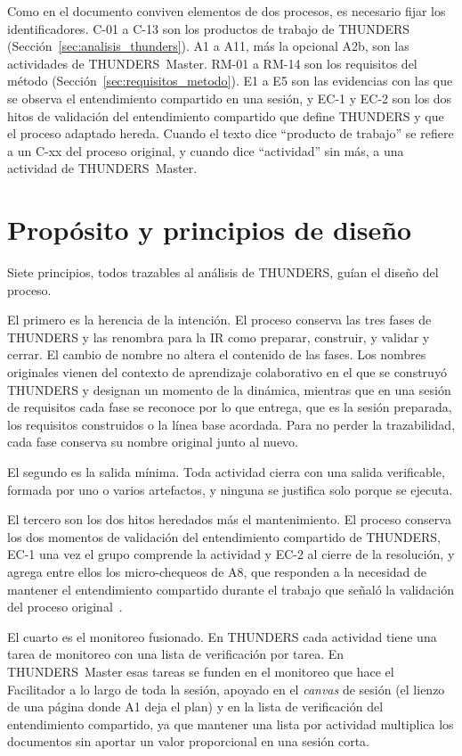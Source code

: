 \documentclass[12pt,letterpaper,oneside]{report}
\begin{document}
Como en el documento conviven elementos de dos procesos, es necesario fijar los
identificadores. C-01 a C-13 son los productos de trabajo de THUNDERS
(Sección~\ref{sec:analisis_thunders}). A1 a A11, más la opcional A2b, son las
actividades de THUNDERS~Master. RM-01 a RM-14 son los requisitos del método
(Sección~\ref{sec:requisitos_metodo}). E1 a E5 son las evidencias con las que
se observa el entendimiento compartido en una sesión, y EC-1 y EC-2 son los dos
hitos de validación del entendimiento compartido que define THUNDERS y que el proceso
adaptado hereda. Cuando el texto dice ``producto de trabajo'' se refiere a un C-xx del
proceso original, y cuando dice ``actividad'' sin más, a una actividad de
THUNDERS~Master.

\section{Propósito y principios de diseño}
\label{sec:principios-v13}
Siete principios, todos trazables al análisis de THUNDERS, guían el diseño del
proceso.

El primero es la herencia de la intención. El proceso conserva las tres fases
de THUNDERS y las renombra para la IR como preparar, construir, y validar y
cerrar. El cambio de nombre no altera el contenido de las fases. Los nombres
originales vienen del contexto de aprendizaje colaborativo en el que se
construyó THUNDERS y designan un momento de la dinámica, mientras que en una
sesión de requisitos cada fase se reconoce por lo que entrega, que es la sesión
preparada, los requisitos construidos o la línea base acordada. Para no perder
la trazabilidad, cada fase conserva su nombre original junto al nuevo.

El segundo es la salida mínima. Toda actividad cierra con una salida
verificable, formada por uno o varios artefactos, y ninguna se
justifica solo porque se ejecuta.

El tercero son los dos hitos heredados más el mantenimiento. El proceso
conserva los dos momentos de validación del entendimiento compartido de THUNDERS, EC-1 una
vez el grupo comprende la actividad y EC-2 al cierre de la resolución, y agrega
entre ellos los micro-chequeos de A8, que responden a la necesidad de mantener
el entendimiento compartido durante el trabajo que señaló la validación del proceso
original~\cite{agredo2022exploratory}.

El cuarto es el monitoreo fusionado. En THUNDERS cada actividad tiene una tarea
de monitoreo con una lista de verificación por tarea. En THUNDERS~Master esas
tareas se funden en el monitoreo que hace el Facilitador a lo largo de toda la
sesión, apoyado en el \textit{canvas} de sesión (el lienzo de una página donde
A1 deja el plan) y en la lista de verificación del entendimiento compartido, ya que
mantener una lista por actividad multiplica los documentos sin aportar un valor
proporcional en una sesión corta.
\end{document}
